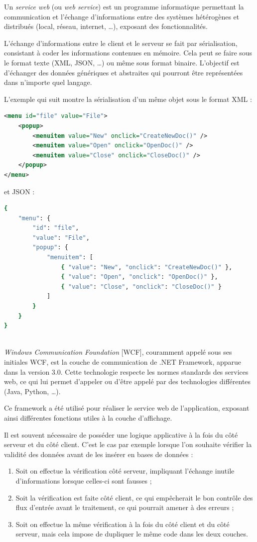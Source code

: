 Un \textit{service web} (ou \textit{web service}) est un programme informatique permettant la communication et l'échange d'informations entre des systèmes hétérogènes et distribués (local, réseau, internet, \ldots), exposant des fonctionnalités.

L'échange d'informations entre le client et le serveur se fait par sérialisation, consistant à coder les informations contenues en mémoire.
Cela peut se faire sous le format texte (XML, JSON, \ldots) ou même sous format binaire.
L'objectif est d'échanger des données génériques et abstraites qui pourront être représentées dans n'importe quel langage.

L'exemple qui suit montre la sérialisation d'un même objet sous le format XML :
\begin{lstlisting}[language = xml]
<menu id="file" value="File">
	<popup>
		<menuitem value="New" onclick="CreateNewDoc()" />
		<menuitem value="Open" onclick="OpenDoc()" />
		<menuitem value="Close" onclick="CloseDoc()" />
	</popup>
</menu>
\end{lstlisting}
et JSON :
\begin{lstlisting}[language = sh]
{
	"menu": {
		"id": "file",
		"value": "File",
		"popup": {
			"menuitem": [
				{ "value": "New", "onclick": "CreateNewDoc()" },
				{ "value": "Open", "onclick": "OpenDoc()" },
				{ "value": "Close", "onclick": "CloseDoc()" }
			]
		}
	}
}
\end{lstlisting}
~~\\

\textit{Windows Communication Foundation} [WCF], couramment appelé sous ses initiales WCF, est la couche de communication de .NET Framework, apparue dans la version 3.0.
Cette technologie respecte les normes standards des services web, ce qui lui permet d'appeler ou d'être appelé par des technologies différentes (Java, Python, \ldots).

Ce framework a été utilisé pour réaliser le service web de l'application, exposant ainsi différentes fonctions utiles à la couche d'affichage.



Il est souvent nécessaire de posséder une logique applicative à la fois du côté serveur et du côté client.
C'est le cas par exemple lorsque l'on souhaite vérifier la validité des données avant de les insérer en bases de données :
\begin{enumerate}
	\item Soit on effectue la vérification côté serveur, impliquant l'échange inutile d'informations lorsque celles-ci sont fausses ;
	\item Soit la vérification est faite côté client, ce qui empêcherait le bon contrôle des flux d'entrée avant le traitement, ce qui pourrait amener à des erreurs ;
	\item Soit on effectue la même vérification à la fois du côté client et du côté serveur, mais cela impose de dupliquer le même code dans les deux couches.
\end{enumerate}
~~\\

